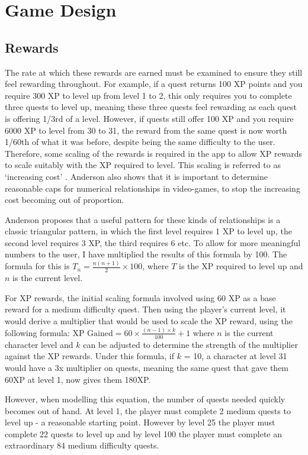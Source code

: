 \section{Game Design}
\subsection{Rewards}
The rate at which these rewards are earned must be examined to ensure they still feel rewarding throughout. 
For example, if a quest returns 100 XP points and you require 300 XP to level up from level 1 to 2, this only requires you to complete three quests to level up, meaning these three quests feel rewarding as each quest is offering 1/3rd of a level.
However, if quests still offer 100 XP and you require 6000 XP to level from 30 to 31, the reward from the same quest is now worth 1/60th of what it was before, despite being the same difficulty to the user.
Therefore, some scaling of the rewards is required in the app to allow XP rewards to scale suitably with the XP required to level.
This scaling is referred to as `increasing cost' \citep{1_anderson_2016}.
Anderson also shows that it is important to determine reasonable caps for numerical relationships in video-games, to stop the increasing cost becoming out of proportion.

Anderson proposes that a useful pattern for these kinds of relationships is a classic triangular pattern, in which the first level requires 1 XP to level up, the second level requires 3 XP, the third requires 6 etc. To allow for more meaningful numbers to the user, I have multiplied the results of this formula by 100. The formula for this is $T_n= \frac{n(n+1)}{2} \times 100$, where $T$ is the XP required to level up and $n$ is the current level.

For XP rewards, the initial scaling formula involved using 60 XP as a base reward for a medium difficulty quest.
Then using the player's current level, it would derive a multiplier that would be used to scale the XP reward, using the following formula: 
$\textrm{XP Gained} = 60 \times \frac{(n - 1) \times k}{100} + 1$ where $n$ is the current character level and $k$ can be adjusted to determine the strength of the multiplier against the XP rewards.
Under this formula, if $k$ = 10, a character at level 31 would have a 3x multiplier on quests, meaning the same quest that gave them 60XP at level 1, now gives them 180XP.

However, when modelling this equation, the number of quests needed quickly becomes out of hand. 
At level 1, the player must complete 2 medium quests to level up - a reasonable starting point.
However by level 25 the player must complete 22 quests to level up and by level 100 the player must complete an extraordinary 84 medium difficulty quests.

